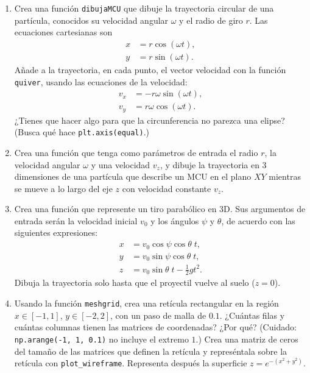 \begin{enumerate}
\item Crea una función \texttt{dibujaMCU} que dibuje la trayectoria circular de una partícula, conocidos su velocidad angular $\omega$ y el radio de giro $r$. Las ecuaciones cartesianas son
\begin{align*}
    x&=r\cos(\omega t),\\
    y&=r\sin (\omega t).
\end{align*}
Añade a la trayectoria, en cada punto, el vector velocidad con la función \texttt{quiver}, usando las ecuaciones de la velocidad:
\begin{align*}
    v_x&=-r \omega \sin(\omega t),\\
    v_y&=r \omega \cos(\omega t).
\end{align*}
¿Tienes que hacer algo para que la circunferencia no parezca una elipse? (Busca qué hace \texttt{plt.axis(\textquotesingle{}equal\textquotesingle{})}.)

\item Crea una función que tenga como parámetros de entrada el radio $r$, la velocidad angular $\omega$ y una velocidad $v_z$, y dibuje la trayectoria en 3 dimensiones de una partícula que describe un MCU en el plano $XY$ mientras se mueve a lo largo del eje $z$ con velocidad constante $v_z$.

\item Crea una función que represente un tiro parabólico en 3D. Sus argumentos de entrada serán la velocidad inicial $v_0$ y los ángulos $\psi$ y $\theta$, de acuerdo con las siguientes expresiones:
\begin{align*}
    x&=v_0 \cos\psi \cos\theta \; t, \\
    y&=v_0 \sin\psi \cos\theta \; t,  \\
    z&=v_0 \sin\theta \; t- \frac{1}{2} g t^2.
\end{align*}
Dibuja la trayectoria solo hasta que el proyectil vuelve al suelo ($z=0$).

\item Usando la función \texttt{meshgrid}, crea una retícula rectangular en la región $x \in [-1, 1]$, $y \in [-2, 2]$, con un paso de malla de $0.1$. ¿Cuántas filas y cuántas columnas tienen las matrices de coordenadas? ¿Por qué? (Cuidado: \texttt{np.arange(-1, 1, 0.1)} no incluye el extremo $1$.) Crea una matriz de ceros del tamaño de las matrices que definen la retícula y represéntala sobre la retícula con \texttt{plot\_wireframe}. Representa después la superficie $z = e^{-(x^2+y^2)}$.


\end{enumerate}
